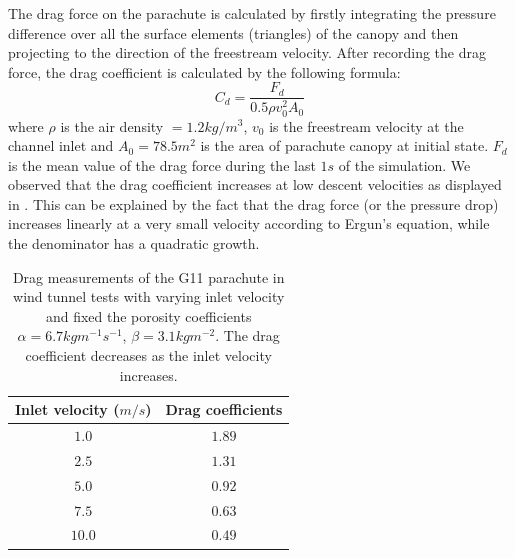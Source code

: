 The drag force on the parachute is calculated by firstly integrating 
the pressure difference over all the surface elements (triangles) of the canopy 
and then projecting to the direction of the freestream velocity. After recording 
the drag force, the drag coefficient is calculated by the following formula: 
\begin{equation} 
C_d = \frac{F_d}{0.5\rho v^2_0A_0}
\label{eq:drag_coeff} 
\end{equation} 
where $\rho$ is the air density $= 1.2kg/m^3$, $v_0$ is the freestream velocity 
at the channel inlet and $A_0 = 78.5m^2$ is the area of parachute canopy at initial 
state. $F_d$ is the mean value of the drag force during the last $1s$ of the 
simulation. We observed that the drag coefficient increases at low descent velocities 
as displayed in . This can be explained by the fact that the drag 
force (or the pressure drop) increases linearly at a very small velocity according to 
Ergun's equation, while the denominator has a quadratic growth.  

\begin{table}[h]
\centering
\begin{tabular}{cc}
\hline\hline
Inlet velocity ($m/s$) & Drag coefficients \\
\hline
$1.0$   & $1.89$ \\ 
$2.5$ & $1.31$ \\
$5.0$   & $0.92$ \\
$7.5$ & $0.63$ \\
$10.0$  & $0.49$\\
\hline
\end{tabular}
\caption{Drag measurements of the G11 parachute in wind tunnel tests
with varying inlet velocity and fixed the porosity coefficients 
$\alpha = 6.7kgm^{-1}s^{-1}$, $\beta = 3.1kgm^{-2}$.  
The drag coefficient decreases as the inlet velocity increases.}
\label{table:drag_coeff} \end{table}


